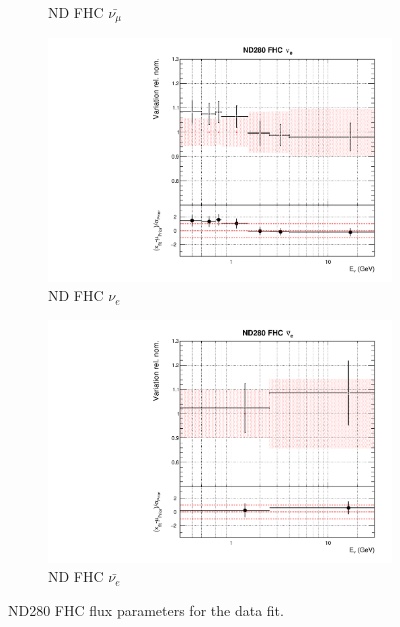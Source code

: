 \begin{figure}[!htbp]
\begin{subfigure}{0.49\textwidth}
  \caption{ND FHC $\bar{\nu_{\mu}}$}
\end{subfigure}
\begin{subfigure}{0.49\textwidth}
  \centering
  \includegraphics[width=0.99\linewidth]{figs/datflux2}
  \caption{ND FHC $\nu_{e}$}
\end{subfigure}
\begin{subfigure}{0.49\textwidth}
  \centering
  \includegraphics[width=0.99\linewidth]{figs/datflux3}
  \caption{ND FHC $\bar{\nu_{e}}$}
\end{subfigure}
\caption{ND280 FHC flux parameters for the data fit.}
\label{fig:datfluxND}
\end{figure}

